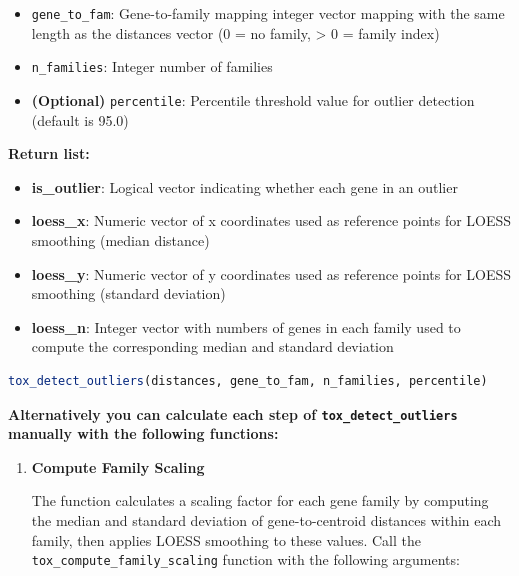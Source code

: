 \documentclass[11pt]{article}
\begin{document}
\begin{enumerate}
\begin{itemize}
	      	\item \texttt{gene\_to\_fam}: Gene-to-family mapping integer vector mapping
	      	      with the same length as the distances vector (0 = no family, \textgreater
	      	      0 = family index)
	      	      
	      	\item \texttt{n\_families}: Integer number of families
	      	      
	      	\item \textbf{(Optional)} \texttt{percentile}: Percentile threshold
	      	      value for outlier detection (default is 95.0)
	      \end{itemize}
	      
	      \textbf{Return list:}
	      \begin{itemize}
	      	\item \textbf{is\_outlier}: Logical vector indicating whether each gene in
	      	      an outlier
	      	      
	      	\item \textbf{loess\_x}: Numeric vector of x coordinates used as reference
	      	      points for LOESS smoothing (median distance)
	      	      
	      	\item \textbf{loess\_y}: Numeric vector of y coordinates used as reference
	      	      points for LOESS smoothing (standard deviation)
	      	      
	      	\item \textbf{loess\_n}: Integer vector with numbers of genes in each family
	      	      used to compute the corresponding median and standard deviation
	      \end{itemize}
	      
	      \begin{lstlisting}[language=R, caption={R Gene Outlier Calculation}]
tox_detect_outliers(distances, gene_to_fam, n_families, percentile)
	      \end{lstlisting}
	      
	      \textbf{Alternatively you can calculate each step of \texttt{tox\_detect\_outliers}
	      manually with the following functions:}
	      \begin{enumerate}
	      	\item \textbf{Compute Family Scaling}
	      	      
	      	      The function calculates a scaling factor for each gene family by computing
	      	      the median and standard deviation of gene-to-centroid distances within
	      	      each family, then applies LOESS smoothing to these values. Call the \texttt{tox\_compute\_family\_scaling}
	      	      function with the following arguments:
	      	      

\end{enumerate}
\end{enumerate}
\end{document}
